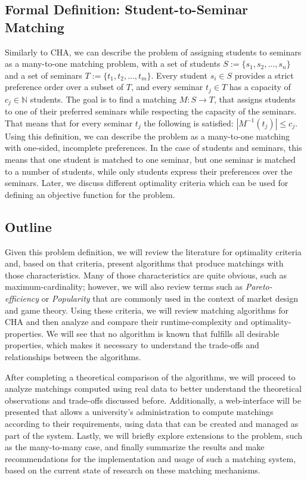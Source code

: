 \subsection{Formal Definition: Student-to-Seminar Matching}
Similarly to CHA, we can describe the problem of assigning students to seminars as a many-to-one matching problem, with a set of students $S:= \{s_1, s_2, ...,s_n\}$ and a set of seminars $T:= \{t_1, t_2, ..., t_m\}$. Every student $s_i \in S$ provides a strict preference order over a subset of $T$, and every seminar $t_j \in T$ has a capacity of $c_j \in \mathbb{N}$ students. The goal is to find a matching $M: S \rightarrow T$, that assigns students to one of their preferred seminars while respecting the capacity of the seminars. That means that for every seminar $t_j$ the following is satisfied: $|M^{-1}(t_j)| \leq c_j$. Using this definition, we can describe the problem as a many-to-one matching with one-sided, incomplete preferences. In the case of students and seminars, this means that one student is matched to one seminar, but one seminar is matched to a number of students, while only students express their preferences over the seminars. Later, we discuss different optimality criteria which can be used for defining an objective function for the problem.

\subsection{Outline}
Given this problem definition, we will review the literature for optimality criteria and, based on that criteria, present algorithms that produce matchings with those characteristics. Many of those characteristics are quite obvious, such as maximum-cardinality; however, we will also review terms such as \emph{Pareto-efficiency} or \emph{Popularity} that are commonly used in the context of market design and game theory. 
Using these criteria, we will review matching algorithms for CHA and then analyze and compare their runtime-complexity and optimality-properties. We will see that no algorithm is known that fulfills all desirable properties, which makes it necessary to understand the trade-offs and relationships between the algorithms. 

After completing a theoretical comparison of the algorithms, we will proceed to analyze matchings computed using real data to better understand the theoretical observations and trade-offs discussed before. Additionally, a web-interface will be presented that allows a university's administration to compute matchings according to their requirements, using data that can be created and managed as part of the system. Lastly, we will briefly explore extensions to the problem, such as the many-to-many case, and finally summarize the results and make recommendations for the implementation and usage of such a matching system, based on the current state of research on these matching mechanisms.

